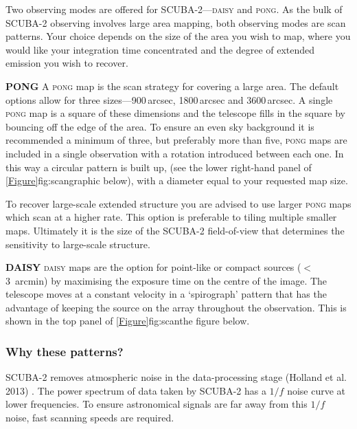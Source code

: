 \documentclass[11pt,oneside,chapters]{starlink}
\begin{document}
Two observing modes are offered for SCUBA-2---\textsc{daisy} and
\textsc{pong}. As the bulk of \mbox{SCUBA-2} observing involves
large area mapping, both observing modes are scan patterns. Your
choice depends on the size of the area you wish to map, where you
would like your integration time concentrated and the degree of
extended emission you wish to recover.


\begin{aligndesc}

\item[\textbf{PONG}] A \textsc{pong} map is the scan strategy for
  covering a large area. The default options allow for three
  sizes---900\,arcsec, 1800\,arcsec and 3600\,arcsec. A single
  \textsc{pong} map is a square of these dimensions and the telescope
  fills in the square by bouncing off the edge of the area. To ensure
  an even sky background it is recommended a minimum of three, but
  preferably more than five, \textsc{pong} maps are included in a
  single observation with a rotation introduced between each one. In
  this way a circular pattern is built up, (see the lower right-hand
  panel of \cref{Figure}{fig:scan}{graphic below}), with a diameter
  equal to your requested map size.

  To recover large-scale extended structure you are advised to use
  larger \textsc{pong} maps which scan at a higher rate. This option
  is preferable to tiling multiple smaller maps. Ultimately it is the
  size of the SCUBA-2 field-of-view that determines the sensitivity to
  large-scale structure.

\item[\textbf{DAISY}] \textsc{daisy} maps are the option for
  point-like or compact sources ($<$3~arcmin) by maximising the
  exposure time on the centre of the image. The telescope moves at a
  constant velocity in a `spirograph' pattern that has the advantage
  of keeping the source on the array throughout the observation. This
  is shown in the top panel of \cref{Figure}{fig:scan}{the figure
    below}.

\end{aligndesc}

\subsubsection{Why these patterns?}

SCUBA-2 removes atmospheric noise in the data-processing
stage (Holland et al. 2013) \cite{s2main}. The power spectrum
of data taken by SCUBA-2 has a $1/f$ noise curve at lower frequencies. To
ensure astronomical signals are far away from this $1/f$ noise, fast
scanning speeds are required.
\end{document}
